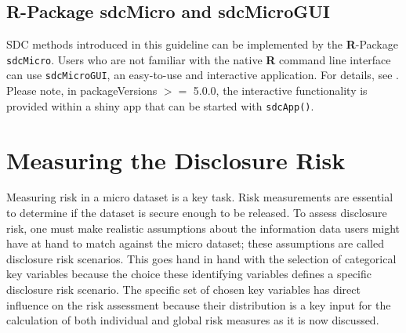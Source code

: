\documentclass[12pt]{scrartcl}\usepackage[]{graphicx}\usepackage[]{color}
\newcommand{\sdcMicro}{\texttt{sdcMicro}}
\newcommand{\sdcMicroGUI}{\texttt{sdcMicroGUI}}
\begin{document}
\subsection{R-Package sdcMicro and sdcMicroGUI}
SDC methods introduced in this guideline can be implemented by the \textbf{R}-Package \sdcMicro . Users who are not familiar with the native \textbf{R}  command line interface can use \sdcMicroGUI , an easy-to-use and interactive application. For details, see \cite{guitutorial,sdcMicro}. Please note, in packageVersions $>=$ 5.0.0, the interactive functionality is provided within a shiny app that can be started with \texttt{sdcApp()}.

\section{Measuring the Disclosure Risk}\label{method:risk_utility}
Measuring risk in a micro dataset is a key task. Risk measurements are essential to determine if the dataset is secure enough to be released. To assess disclosure risk, one must make realistic assumptions about the information data users might have at hand to match against the micro dataset; these assumptions are called disclosure risk scenarios. This goes hand in hand with the selection of categorical key variables because the choice these identifying variables defines a specific disclosure risk scenario. The specific set of chosen key variables has direct influence on the risk assessment because their distribution is a key input for the calculation of both individual and global risk measures as it is now discussed.
\end{document}
